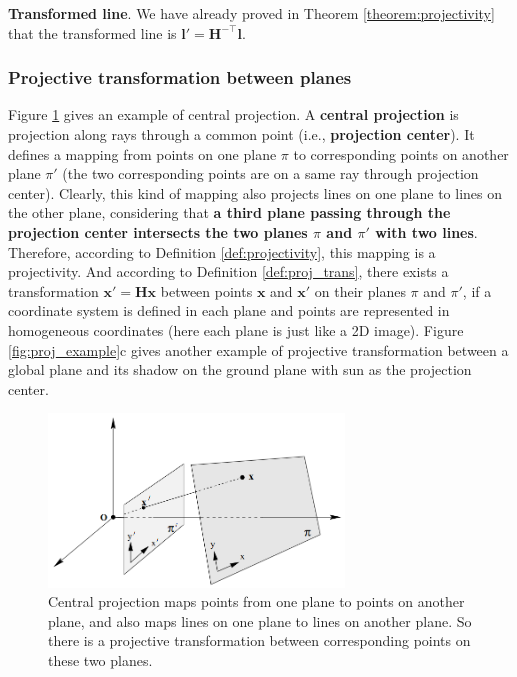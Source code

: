 \documentclass[12pt]{article}
\numberwithin{equation}{section}
\begin{document}
\textbf{Transformed line}. We have already proved in Theorem \ref{theorem:projectivity} that the transformed line is $\mathbf{l' = H^{-\top}l}$.


\subsubsection{Projective transformation between planes}

Figure \ref{fig:central_proj} gives an example of central projection. A \textbf{central projection} is projection along rays through a common point (i.e., \textbf{projection center}). It defines a mapping from points on one plane $\pi$ to corresponding points on another plane $\pi'$ (the two corresponding points are on a same ray through projection center). Clearly, this kind of mapping also projects lines on one plane to lines on the other plane, considering that \textbf{a third plane passing through the projection center intersects the two planes $\pi$ and $\pi'$ with two lines}. Therefore, according to Definition \ref{def:projectivity}, this mapping is a projectivity. And according to Definition \ref{def:proj_trans}, there exists a transformation $\mathbf{x}' = \mathbf{Hx}$ between points $\mathbf{x}$ and $\mathbf{x}'$ on their planes $\pi$ and $\pi'$, if a coordinate system is defined in each plane and points are represented in homogeneous coordinates (here each plane is just like a 2D image).  Figure \ref{fig:proj_example}c gives another example of projective transformation between a global plane and its shadow on the ground plane with sun as the projection center.

\begin{figure}[h]
\begin{center}
\includegraphics[width=0.7\textwidth]{central_proj.png}
\end{center}
\caption{Central projection maps points from one plane to points on another plane, and also maps lines on one plane to lines on another plane. So there is a projective transformation between corresponding points on these two planes.}
\label{fig:central_proj}
\end{figure}
\end{document}
